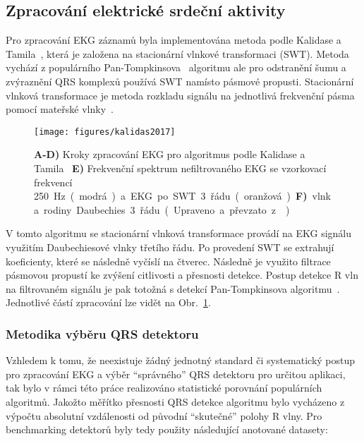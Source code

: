 \subsection{Zpracování elektrické srdeční aktivity}
\label{subsec:zpracovani_ekg}
Pro zpracování EKG záznamů byla implementována metoda podle Kalidase a
Tamila~\cite{kalidas2017}, která je založena na stacionární vlnkové transformaci
(\gls{SWT}). Metoda vychází z populárního Pan-Tompkinsova~\cite{Tompkins1985}
algoritmu ale pro odstranění šumu a zvýraznění QRS komplexů používá \gls{SWT}
namísto pásmové propusti. Stacionární vlnková transformace je metoda rozkladu
signálu na jednotlivá frekvenční pásma pomocí mateřské vlnky~\cite{Nason1995}.

\begin{figure}[H]
    \begin{center}
        \texttt{[image: figures/kalidas2017]}
        \caption{\textbf{A-D)} Kroky zpracování EKG pro algoritmus podle
            Kalidase a Tamila~\cite{kalidas2017} \textbf{E)} Frekvenční spektrum
            nefiltrovaného EKG se vzorkovací frekvencí 250~\si\Hz~(modrá) a EKG po
            SWT 3. řádu (oranžová). \textbf{F)} vlnka rodiny Daubechies 3. řádu.
            (Upraveno a převzato z~\cite{Porr2019})}
        \label{fig:kalidas_processing}
    \end{center}
\end{figure}

V tomto algoritmu se stacionární vlnková transformace provádí na EKG signálu
využitím Daubechiesové vlnky třetího řádu. Po provedení \gls{SWT} se extrahují
koeficienty, které se následně vyčíslí na čtverec. Následně je využito filtrace
pásmovou propustí ke zvýšení citlivosti a přesnosti detekce. Postup detekce R
vln na filtrovaném signálu je pak totožná s detekcí Pan-Tompkinsova
algoritmu~\cite{Tompkins1985}. Jednotlivé částí zpracování lze vidět na
Obr.~\ref{fig:kalidas_processing}.

\subsubsection{Metodika výběru QRS detektoru}
\label{subsubsec:vyberqrs}
Vzhledem k tomu, že neexistuje žádný jednotný standard či systematický postup
pro zpracování EKG a výběr \enquote{správného} QRS detektoru pro určitou
aplikaci, tak bylo v rámci této práce realizováno statistické porovnání
populárních algoritmů. Jakožto měřítko přesnosti QRS detekce algoritmu bylo
vycházeno z výpočtu absolutní vzdálenosti od původní \enquote{skutečné} polohy R
vlny. Pro benchmarking detektorů byly tedy použity následující anotované
datasety:

